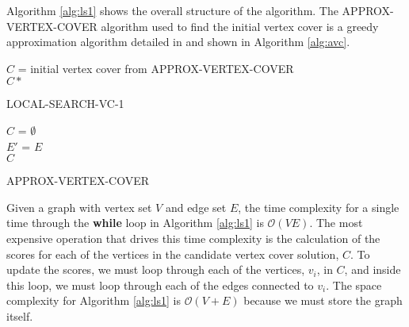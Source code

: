 \documentclass[sigconf]{acmart}
\newcommand{\bigo}[1]{\mathcal{O}(#1)}
\begin{document}
Algorithm \ref{alg:ls1} shows the overall structure of the algorithm. The APPROX-VERTEX-COVER algorithm used to find the initial vertex cover is a greedy approximation algorithm detailed in \cite{intro_alg_2009} and shown in Algorithm \ref{alg:avc}.

\begin{algorithm}[h]
	\SetAlgoNoLine
	$C$ = initial vertex cover from APPROX-VERTEX-COVER\\
	\Return $C*$
	\caption{LOCAL-SEARCH-VC-1}
	\label{alg:ls1}
\end{algorithm}

\begin{algorithm}[h]
	\SetAlgoNoLine
	$C$ = $\emptyset$\\
	$E'$ = $E$\\
	\Return $C$
	
	\caption{APPROX-VERTEX-COVER}
	\label{alg:avc}
\end{algorithm}

Given a graph with vertex set $V$ and edge set $E$, the time complexity for a single time through the \textbf{while} loop in Algorithm \ref{alg:ls1} is $\bigo{VE}$. The most expensive operation that drives this time complexity is the calculation of the scores for each of the vertices in the candidate vertex cover solution, $C$. To update the scores, we must loop through each of the vertices, $v_i$, in $C$, and inside this loop, we must loop through each of the edges connected to $v_i$. The space complexity for Algorithm \ref{alg:ls1} is $\bigo{V + E}$ because we must store the graph itself.
\end{document}
